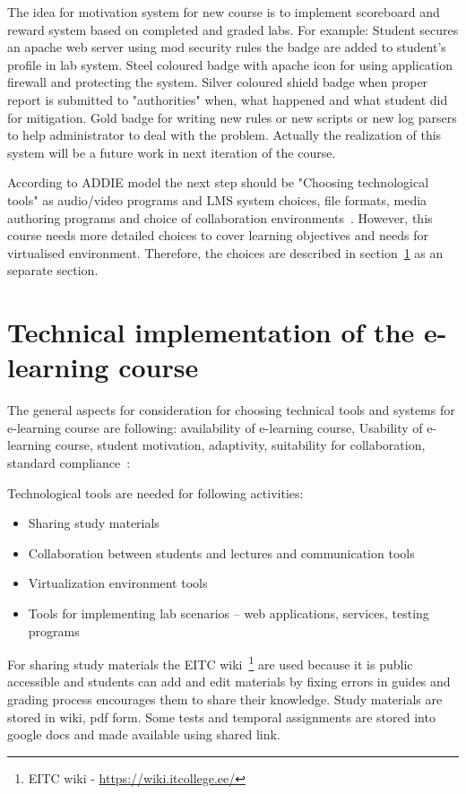 The idea for motivation system for new course is to implement scoreboard and reward system based on completed and graded labs. For example: Student secures an apache web server using mod security rules the badge are added to student's profile in lab system. Steel coloured badge with apache icon for using application firewall and protecting the system. Silver coloured shield badge when proper report is submitted to "authorities" when, what happened and what student did for mitigation. Gold badge for writing new rules or new scripts or new log parsers to help administrator to deal with the problem. Actually the realization of this system will be a future work in next iteration of the course.

According to \gls{ADDIE} model the next step should be "Choosing technological tools" as audio/video programs and \gls{LMS} system choices, file formats, media authoring programs and choice of collaboration environments~\citep{OppeArenduskeskus2010}. However, this course needs more detailed choices to cover learning objectives and needs for virtualised environment. Therefore, the choices are described in section~\ref{Technical implementation of the e-learning course} as an separate section. 

\section{Technical implementation of the e-learning course}
\label{Technical implementation of the e-learning course}

The general aspects for consideration for choosing technical tools and systems for e-learning course are following: availability of e-learning course, Usability of e-learning course, student motivation, adaptivity, suitability for collaboration, standard compliance~\citep{OppeArenduskeskus2010}:

Technological tools are needed for following activities: 
\begin{itemize}
\item Sharing study materials
\item Collaboration between students and lectures and communication tools
\item Virtualization environment tools
\item Tools for implementing lab scenarios -- web applications, services, testing programs
\end{itemize}

For sharing study materials the \gls{EITC} wiki~\footnote{\gls{EITC} wiki - \url{https://wiki.itcollege.ee/}} are used because it is public accessible and students can add and edit materials by fixing errors in guides and grading process encourages them to share their knowledge. Study materials are stored in wiki, pdf form. Some tests and temporal assignments are stored into google docs and made available using shared link.

